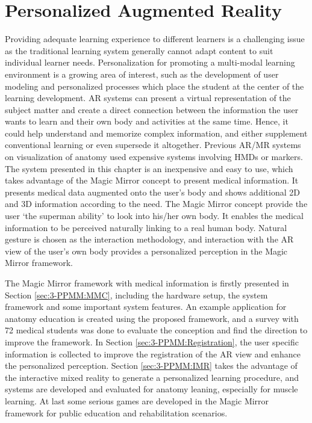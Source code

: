 
\chapter{Personalized Augmented Reality} \label{chaptor:3}
Providing adequate learning experience to different learners is a challenging issue as the traditional learning system generally cannot adapt content to suit individual learner needs. Personalization for promoting a multi-modal learning environment is a growing area of interest, such as the development of user modeling and personalized processes which place the student at the center of the learning development.
AR systems can present a virtual representation of the subject matter and create a direct connection between the information the user wants to learn and their own body and activities at the same time. Hence, it could help understand and memorize complex information, and either supplement conventional learning or even supersede it altogether. 
Previous AR/MR systems on visualization of anatomy used expensive systems involving HMDs or markers. The system presented in this chapter is an inexpensive and easy to use, which takes advantage of the Magic Mirror concept to present medical information. It presents medical data augmented onto the user's body and shows additional 2D and 3D information according to the need. The Magic Mirror concept provide the user `the superman ability' to look into his/her own body. It enables the medical information to be perceived naturally linking to a real human body. Natural gesture is chosen as the interaction methodology, and interaction with the AR view of the user's own body provides a personalized perception in the Magic Mirror framework.

The Magic Mirror framework with medical information is firstly presented in Section \ref{sec:3-PPMM:MMC}, including the hardware setup, the system framework and some important system features. An example application for anatomy education is created using the proposed framework, and a survey with 72  medical students was done to evaluate the conception and find the direction to improve the framework. In Section \ref{sec:3-PPMM:Registration}, the user specific information is collected to improve the registration of the AR view and enhance the personalized perception. Section \ref{sec:3-PPMM:IMR} takes the advantage of the interactive mixed reality to generate a personalized learning procedure, and systems are developed and evaluated for anatomy leaning, especially for muscle learning. At last some serious games are developed in the Magic Mirror framework for public education and rehabilitation scenarios.